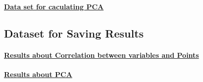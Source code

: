 \paragraph{\href{https://github.com/QianZeHao123/IMDS/blob/main/notes_and_assignments/group-project/src/Results/2023_24_Processed_PCA.csv}{Data set for caculating PCA}}
% 
% 
\subsection{Dataset for Saving Results}
% 
% 
\paragraph{\href{https://github.com/QianZeHao123/IMDS/blob/main/notes_and_assignments/group-project/src/Results/Cor_result.csv}{Results about Correlation between variables and Points}}
% 
% 
\paragraph{\href{https://github.com/QianZeHao123/IMDS/blob/main/notes_and_assignments/group-project/src/Results/pca_result.csv}{Results about PCA}}
% 
% 
% 
% 
% 
% 
% 
% 
% 
% 
% 
% 
% 
% 
% 
% 
% 
% 
% 
% 
% 
